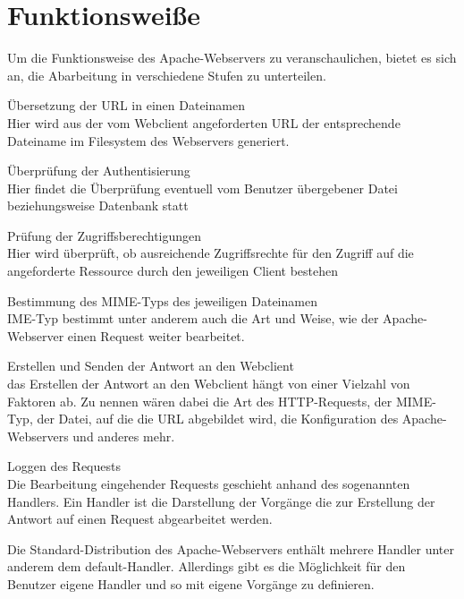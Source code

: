 \newpage



\section{Funktionsweiße}
Um die Funktionsweise des Apache-Webservers zu veranschaulichen, bietet es 
sich an, die Abarbeitung in verschiedene Stufen zu unterteilen.
\begin{description}

\item{Übersetzung der URL in einen Dateinamen\\  Hier wird aus der vom 
Webclient angeforderten URL der entsprechende Dateiname im Filesystem 
des Webservers generiert.}

\item{Überprüfung der Authentisierung \\ Hier findet die Überprüfung eventuell 
vom Benutzer übergebener Datei beziehungsweise Datenbank statt}

\item{Prüfung der Zugriffsberechtigungen \\Hier wird überprüft, ob ausreichende 
Zugriffsrechte für den Zugriff auf die angeforderte Ressource durch den jeweiligen Client bestehen}

\item{Bestimmung des MIME-Typs des jeweiligen Dateinamen \\IME-Typ bestimmt unter anderem auch die Art und Weise, wie der Apache-Webserver einen Request weiter 
bearbeitet.  }

\item{Erstellen und Senden der Antwort an den Webclient \\ das Erstellen der 
Antwort an den Webclient hängt von einer Vielzahl von Faktoren 
ab. Zu nennen wären dabei die Art des HTTP-Requests, der MIME-Typ, der Datei, auf die die URL abgebildet wird, die Konfiguration des Apache-Webservers und anderes mehr.}


\item{Loggen des Requests \\ Die Bearbeitung eingehender Requests geschieht anhand des sogenannten Handlers. Ein Handler ist die Darstellung der Vorgänge die zur Erstellung der Antwort auf einen Request abgearbeitet werden. }
\end{description}
Die Standard-Distribution des Apache-Webservers enthält mehrere Handler unter anderem dem default-Handler. Allerdings gibt es die Möglichkeit für den Benutzer eigene Handler und so mit eigene Vorgänge zu definieren.

